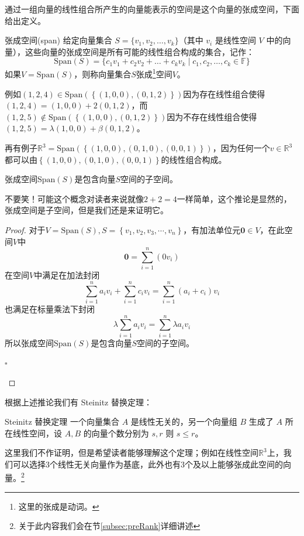 通过一组向量的线性组合所产生的向量能表示的空间是这个向量的张成空间，下面给出定义。

\begin{definition}{张成空间(span)}
	给定向量集合 $ S = \{v_1, v_2, \dots, v_k\} $（其中 $ v_i $ 是线性空间 $ V $ 中的向量），这些向量的张成空间是所有可能的线性组合构成的集合，记作：$$\text{Span}(S) = \{ c_1 v_1 + c_2 v_2 + \dots + c_k v_k \mid c_1, c_2, \dots, c_k \in \mathbb{F} \}$$如果$V=\text{Span}(S)$，则称向量集合$S$张成\footnote{这里的张成是动词。}空间$V$。
\end{definition}

例如$(1,2,4) \in \text{Span}(\left\{ (1,0,0),(0,1,2) \right\})$因为存在线性组合使得$(1,2,4)=(1,0,0)+2(0,1,2)$，而$(1,2,5) \notin \text{Span}(\left\{ (1,0,0),(0,1,2) \right\})$因为不存在线性组合使得$(1,2,5)=\lambda (1,0,0)+\beta (0,1,2)$。

再有例子$\mathbb{R}^3=\text{Span}(\left\{ (1,0,0),(0,1,0),(0,0,1) \right\})$，因为任何一个$v\in \mathbb{R}^3$都可以由$\left\{ (1,0,0),(0,1,0),(0,0,1) \right\}$的线性组合构成。

\begin{corollary}
	张成空间$\text{Span}(S)$是包含向量$S$空间的子空间。
\end{corollary}

不要笑！可能这个概念对读者来说就像$2+2=4$一样简单，这个推论是显然的，张成空间是子空间，但是我们还是来证明它。

\begin{proof}
	对于$V=\text{Span}(S),S=\left\{ v_1,v_2,v_3,\cdots,v_n \right\}$，有加法单位元$\boldsymbol{0}\in V$，在此空间$V$中$$\boldsymbol{0}=\sum_{i=1}^{n}(0v_i) $$在空间$V$中满足在加法封闭$$\sum_{i=1}^{n}a_iv_i+ \sum_{i=1}^{n}c_iv_i=\sum_{i=1}^{n}(a_i+c_i)v_i$$也满足在标量乘法下封闭$$\lambda \sum_{i=1}^{n}a_iv_i= \sum_{i=1}^{n}\lambda a_iv_i$$所以张成空间$\text{Span}(S)$是包含向量$S$空间的子空间。
	\begin{flushright}
		$\square$
	\end{flushright}
\end{proof}

根据上述推论我们有 Steinitz 替换定理：

\begin{theorem}{Steinitz 替换定理}
	\label{the:Steinitz}
	一个向量集合 $ A $ 是线性无关的，另一个向量组 $ B $ 生成了 $ A $ 所在线性空间，设 $A,B$ 的向量个数分别为 $s,r$ 则 $s\le r$。
\end{theorem}

这里我们不作证明，但是希望读者能够理解这个定理；例如在线性空间$\mathbb{R}^3$上，我们可以选择3个线性无关向量作为基底，此外也有3个及以上能够张成此空间的向量。\footnote{关于此内容我们会在节\ref{subsec:preRank}详细讲述}

